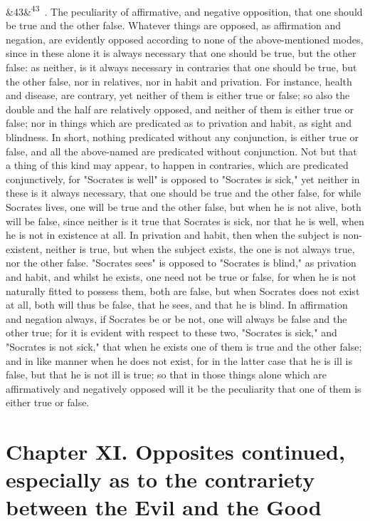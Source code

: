 \documentclass[12pt]{article}
\newcommand{\para}[1][]{\par\noindent\ifx&#1&\else\textsuperscript{\footnotesize #1}~\fi}
\begin{document}
\para[43] 7. The peculiarity of affirmative, and negative opposition, that one should be true and the other false. Whatever things are opposed, as affirmation and negation, are evidently opposed according to none of the above-mentioned modes, since in these alone it is always necessary that one should be true, but the other false: as neither, is it always necessary in contraries that one should be true, but the other false, nor in relatives, nor in habit and privation. For instance, health and disease, are contrary, yet neither of them is either true or false; so also the double and the half are relatively opposed, and neither of them is either true or false; nor in things which are predicated as to privation and habit, as sight and blindness. In short, nothing predicated without any conjunction, is either true or false, and all the above-named are predicated without conjunction. Not but that a thing of this kind may appear, to happen in contraries, which are predicated conjunctively, for "Socrates is well" is opposed to "Socrates is sick," yet neither in these is it always necessary, that one should be true and the other false, for while Socrates lives, one will be true and the other false, but when he is not alive, both will be false, since neither is it true that Socrates is sick, nor that he is well, when he is not in existence at all. In privation and habit, then when the subject is non-existent, neither is true, but when the subject exists, the one is not always true, nor the other false. "Socrates sees" is opposed to "Socrates is blind," as privation and habit, and whilst he exists, one need not be true or false, for when he is not naturally fitted to possess them, both are false, but when Socrates does not exist at all, both will thus be false, that he sees, and that he is blind. In affirmation and negation always, if Socrates be or be not, one will always be false and the other true; for it is evident with respect to these two, "Socrates is sick," and "Socrates is not sick," that when he exists one of them is true and the other false; and in like manner when he does not exist, for in the latter case that he is ill is false, but that he is not ill is true; so that in those things alone which are affirmatively and negatively opposed will it be the peculiarity that one of them is either true or false.

\section*{Chapter XI. Opposites continued, especially as to the contrariety between the Evil and the Good}
\end{document}

